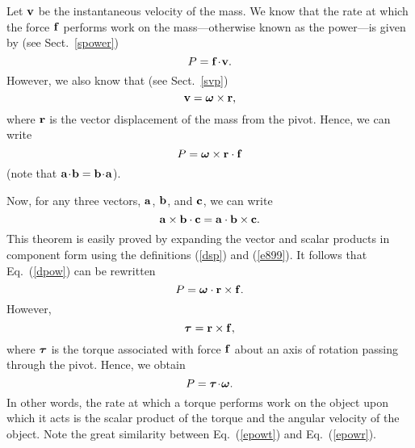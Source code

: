Let ${\bf v}$ be the instantaneous velocity of the mass. We know that the
rate at which the force ${\bf f}$ performs work on the mass---otherwise known
as the power---is given by (see Sect.~\ref{spower})
\begin{equation}\label{epowt}
P = {\bf f}\!\cdot\!{\bf v}.
\end{equation}
However, we also know that (see Sect.~\ref{svp})
\begin{equation}
{\bf v} = \mbox{\boldmath$\omega$}\times {\bf r},
\end{equation}
where ${\bf r}$ is the vector displacement of the mass from the pivot. 
Hence, we can write
\begin{equation}\label{dpow}
P = \mbox{\boldmath$\omega$}\times {\bf r} \cdot  {\bf f}
\end{equation}
(note that  ${\bf a}\!\cdot\!{\bf b}={\bf b}\!\cdot\!{\bf a}$).

Now, for any three vectors, ${\bf a}$, ${\bf b}$, and ${\bf c}$, we can write
\begin{equation}
{\bf a}\times {\bf b} \cdot  {\bf c}= {\bf a}\cdot{\bf b} \times {\bf c}.
\end{equation}
This theorem is  easily proved by expanding the vector and scalar products in component
form using the definitions (\ref{dsp}) and (\ref{e899}). It follows
that Eq.~(\ref{dpow}) can be rewritten
\begin{equation}
P = \mbox{\boldmath$\omega$}\cdot {\bf r} \times {\bf f}.
\end{equation}
However,
\begin{equation}
\mbox{\boldmath$\tau$} = {\bf r}\times{\bf f},
\end{equation}
where $\mbox{\boldmath$\tau$}$ is the torque associated with force ${\bf f}$ about an axis of rotation passing
through the pivot. Hence, we obtain
\begin{equation}\label{epowr}
P = \mbox{\boldmath$\tau$}\!\cdot\!\mbox{\boldmath$\omega$}.
\end{equation}
In other words, the rate at which a torque performs work on the object upon which
it acts is the scalar product of the torque and the angular velocity of the object.
Note the great similarity between Eq.~(\ref{epowt}) and Eq.~(\ref{epowr}).

